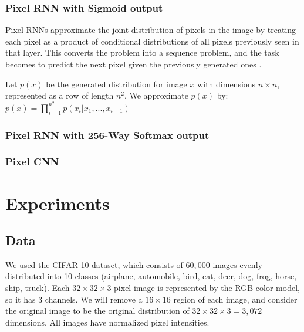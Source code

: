 \documentclass[10pt,twocolumn,letterpaper]{article}
\begin{document}
\subsubsection{Pixel RNN with Sigmoid output}
Pixel RNNs approximate the joint distribution of pixels in the image by treating each pixel as a product of conditional distributions of all pixels previously seen in that layer.  This converts the problem into a sequence problem, and the task becomes to predict the next pixel given the previously generated ones \cite{pixelRNN}. 

Let $p(x)$ be the generated distribution for image $x$ with dimensions $n \times n$, represented as a row of length $n^2$. We approximate $p(x)$ by: \\
$p(x) = \prod_{i=1}^{n^2} p(x_i | x_1, ... , x_{i-1} )$

\subsubsection{Pixel RNN with 256-Way Softmax output}



\subsubsection{Pixel CNN}




\section{Experiments} 
\subsection{Data}
We used the CIFAR-10 dataset, which consists of $60,000$ images evenly distributed into 10 classes (airplane, automobile, bird, cat, deer, dog, frog, horse, ship, truck). Each $32 \times 32 \times 3$ pixel image is represented by the RGB color model, so it has 3 channels. We will remove a $16 \times 16$ region of each image, and consider the original image to be the original distribution of $32 \times 32 \times 3 = 3,072$ dimensions. All images have normalized pixel intensities. \\
\end{document}
